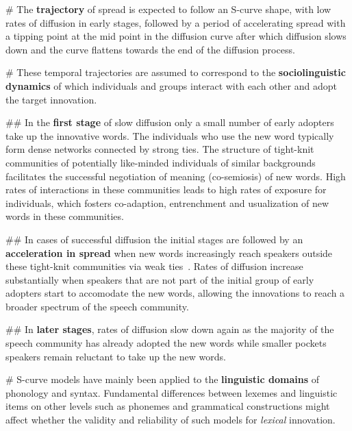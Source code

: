 \documentclass[
  a4paper,
  ]{scrartcl}
\renewcommand{\hw}[1]{\textbf{#1}}
\begin{document}
    \begin{easylist}[itemize]

      # The \hw{trajectory} of spread is expected to follow an S-curve shape, with low rates of diffusion in early stages, followed by a period of accelerating spread with a tipping point at the mid point in the diffusion curve after which diffusion slows down and the curve flattens towards the end of the diffusion process.

      # These temporal trajectories are assumed to correspond to the \hw{sociolinguistic dynamics} of which individuals and groups interact with each other and adopt the target innovation.

        ## In the \hw{first stage} of slow diffusion only a small number of early adopters take up the innovative words. The individuals who use the new word typically form dense networks connected by strong ties. The structure of tight-knit communities of potentially like-minded individuals of similar backgrounds facilitates the successful negotiation of meaning (co-semiosis) of new words. High rates of interactions in these communities leads to high rates of exposure for individuals, which fosters co-adaption, entrenchment and usualization of new words in these communities.

        ## In cases of successful diffusion the initial stages are followed by an \hw{acceleration in spread} when new words increasingly reach speakers outside these tight-knit communities via weak ties~\parencite{Granovetter1977}. Rates of diffusion increase substantially when speakers that are not part of the initial group of early adopters start to accomodate the new words, allowing the innovations to reach a broader spectrum of the speech community.

        ## In \hw{later stages}, rates of diffusion slow down again as the majority of the speech community has already adopted the new words while smaller pockets speakers remain reluctant to take up the new words.

      # S-curve models have mainly been applied to the \hw{linguistic domains} of phonology and syntax. Fundamental differences between lexemes and linguistic items on other levels such as phonemes and grammatical constructions might affect whether the validity and reliability of such models for \emph{lexical} innovation.


\end{easylist}
\end{document}
